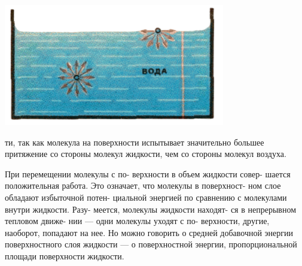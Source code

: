 \begin{multicols}{2}
\begin{Figure}
 \centering
  \includegraphics[width=\linewidth]{pic1.png}
  \begin{flushright}
  \end{flushright}
  \label{ris:image}
\end{Figure}

\large
\noindent
ти, так как молекула на поверхности\linebreak
испытывает значительно большее\linebreak
притяжение со стороны молекул\linebreak
жидкости, чем со стороны молекул\linebreak
воздуха.

При перемещении молекулы с по-\linebreak
верхности в объем жидкости совер-\linebreak
шается положительная работа. Это\linebreak
означает, что молекулы в поверхност-\linebreak
ном слое обладают избыточной потен-\linebreak
циальной энергией по сравнению с\linebreak
молекулами внутри жидкости. Разу-\linebreak
меется, молекулы жидкости находят-\linebreak
ся в непрерывном тепловом движе-\linebreak
нии — одни молекулы уходят с по-\linebreak
верхности, другие, наоборот, попадают\linebreak
на нее. Но можно говорить о средней\linebreak
добавочной энергии поверхностного\linebreak
слоя жидкости — о поверхностной\linebreak
энергии, пропорциональной площади\linebreak
поверхности жидкости.


\end{multicols}
